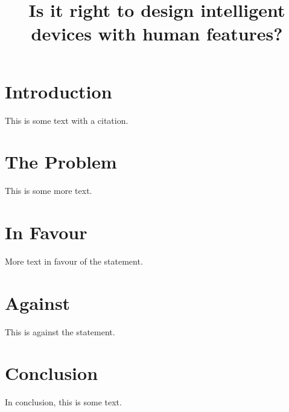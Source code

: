 \documentclass{article}
\begin{document}
\title{\Large Is it right to design intelligent devices with human features?}
\maketitle

\section{Introduction}
This is some text\cite{brin1998anatomy} with a citation.

\section{The Problem}
This is some more text.

\section{In Favour}
More text in favour of the statement.

\section{Against}
This is against the statement.

\section{Conclusion}
In conclusion, this is some text.

\vspace{.5cm}



\end{document}
